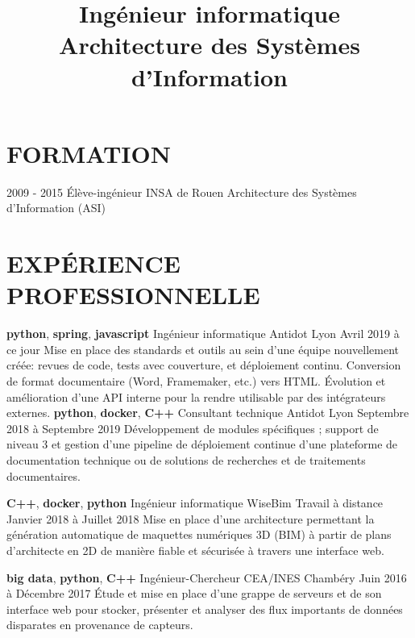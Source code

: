 \documentclass[11pt,a4paper]{moderncv}
\title{
  Ingénieur informatique \newline{}
  Architecture des Systèmes d'Information
}
\begin{document}
  \maketitle
  \vspace*{-5mm}
    \section{FORMATION}
    \cventry
    {2009 - 2015}
    {Élève-ingénieur}
    {INSA de Rouen}
    {Architecture des Systèmes d'Information (ASI)}
    {}{}



  \section{EXPÉRIENCE PROFESSIONNELLE}
  \cventry
    {\textbf{python}, \textbf{spring}, \textbf{javascript}}
    {Ingénieur informatique}
    {Antidot}
    {Lyon}
    {Avril 2019 à ce jour}{
      Mise en place des standards et outils au sein d'une équipe nouvellement créée: revues de code,
      tests avec couverture, et déploiement continu. Conversion de format documentaire (Word, Framemaker, etc.) vers
      HTML. Évolution et amélioration d'une API interne pour la rendre utilisable par des intégrateurs externes.
    }
  \cventry
    {\textbf{python}, \textbf{docker}, \textbf{C++}}
    {Consultant technique}
    {Antidot}
    {Lyon}
    {Septembre 2018 à Septembre 2019}{
      Développement de modules spécifiques ; support de niveau 3 et gestion d'une pipeline de déploiement
      continue d'une plateforme de documentation technique ou de solutions de recherches et de traitements documentaires.
    }

  \cventry
    {\textbf{C++}, \textbf{docker}, \textbf{python}}
    {Ingénieur informatique}
    {WiseBim}
    {Travail à distance}
    {Janvier 2018 à Juillet 2018}{
      Mise en place d'une architecture permettant la génération automatique de
      maquettes numériques 3D (BIM) à partir de plans d'architecte en 2D de
      manière fiable et sécurisée à travers une interface web.
    }

  \cventry
    {\textbf{big data}, \textbf{python}, \textbf{C++}}
    {Ingénieur-Chercheur}
    {CEA/INES}
    {Chambéry}
    {Juin 2016 à Décembre 2017}{
      Étude et mise en place d'une grappe de serveurs et de son interface web
      pour stocker, présenter et analyser des flux importants de données
      disparates en provenance de capteurs.
    }
\end{document}
